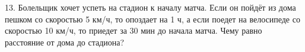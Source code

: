13. Болельщик хочет успеть на стадион к началу матча. Если он пойдёт из дома пешком со скоростью 5 км/ч, то опоздает на 1 ч, а если поедет на велосипеде со скоростью 10 км/ч, то приедет за 30 мин до начала матча. Чему равно расстояние от дома до стадиона?\\
